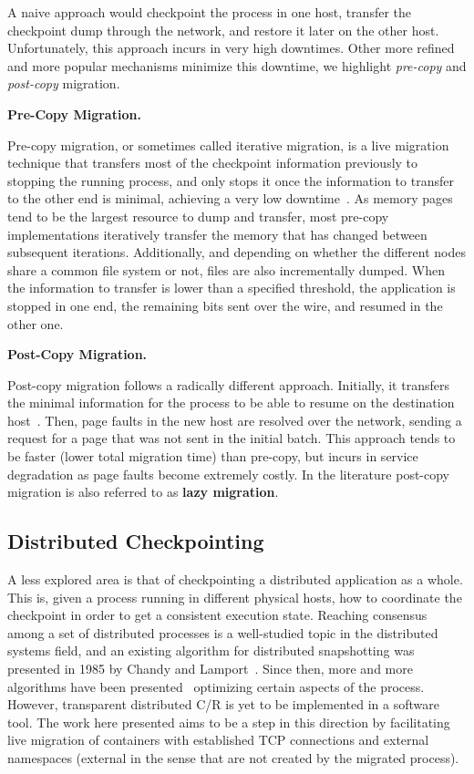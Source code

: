 A naive approach would checkpoint the process in one host, transfer the checkpoint dump through the network, and restore it later on the other host.
Unfortunately, this approach incurs in very high downtimes.
Other more refined and more popular mechanisms minimize this downtime, we highlight \textit{pre-copy} and \textit{post-copy} migration.

\textbf{Pre-Copy Migration.}

Pre-copy migration, or sometimes called iterative migration, is a live migration technique that transfers most of the checkpoint information previously to stopping the running process, and only stops it once the information to transfer to the other end is minimal, achieving a very low downtime~\cite{Bradford2007}.
As memory pages tend to be the largest resource to dump and transfer, most pre-copy implementations iteratively transfer the memory that has changed between subsequent iterations. 
Additionally, and depending on whether the different nodes share a common file system or not, files are also incrementally dumped.
When the information to transfer is lower than a specified threshold, the application is stopped in one end, the remaining bits sent over the wire, and resumed in the other one.

\textbf{Post-Copy Migration.}

Post-copy migration follows a radically different approach.
Initially, it transfers the minimal information for the process to be able to resume on the destination host~\cite{Shirbam2012}.
Then, page faults in the new host are resolved over the network, sending a request for a page that was not sent in the initial batch.
This approach tends to be faster (lower total migration time) than pre-copy, but incurs in service degradation as page faults become extremely costly.
In the literature post-copy migration is also referred to as \textbf{lazy migration}.

\subsection{Distributed Checkpointing}

A less explored area is that of checkpointing a distributed application as a whole.
This is, given a process running in different physical hosts, how to coordinate the checkpoint in order to get a consistent execution state.
Reaching consensus among a set of distributed processes is a well-studied topic in the distributed systems field, and an existing algorithm for distributed snapshotting was presented in 1985 by Chandy and Lamport~\cite{Lamport1985}.
Since then, more and more algorithms have been presented~\cite{Raynal2013,Kshemkalyani2008} optimizing certain aspects of the process.
However, transparent distributed C/R is yet to be implemented in a software tool.
The work here presented aims to be a step in this direction by facilitating live migration of containers with established TCP connections and external namespaces (external in the sense that are not created by the migrated process).

